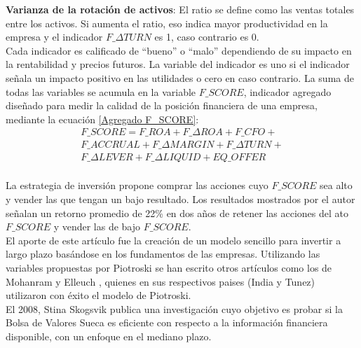 \textbf{Varianza de la rotación de activos}: El ratio se define como las ventas totales entre los activos. Si aumenta el ratio, eso indica mayor productividad en la empresa y el indicador $F\_\Delta TURN$ es 1, caso contrario es 0.\\

Cada indicador es calificado de “bueno” o “malo” dependiendo de su impacto en la rentabilidad y precios futuros. La variable del indicador es uno si el indicador señala un impacto positivo en las utilidades o cero en caso contrario. La suma de todas las variables se acumula en la variable $F\_SCORE$, indicador agregado diseñado para medir la calidad de la posición financiera de una empresa,  mediante la ecuaci\'on \ref{Agregado F_SCORE}:\\

\begin{multline}
\label{Agregado F_SCORE}
F\_SCORE = F\_ROA + F\_\Delta ROA + F\_CFO + \\
F\_ACCRUAL + F\_\Delta MARGIN + F\_\Delta TURN + \\
F\_\Delta LEVER + F\_\Delta LIQUID + EQ\_OFFER \\
\end{multline}

La estrategia de inversión propone comprar las acciones cuyo $F\_SCORE$ sea alto y vender las que tengan un bajo resultado. Los resultados mostrados por el autor señalan un retorno promedio de 22\% en dos años de retener las acciones del ato $F\_SCORE$ y vender las de bajo $F\_SCORE$.\\

El aporte de este art\'iculo fue la creación de un modelo sencillo para invertir a largo plazo basándose en los fundamentos de las empresas. Utilizando las variables propuestas por Piotroski se han escrito otros artículos como los de Mohanram \cite{Mohanram2005} y Elleuch \cite{Elleuch2009}, quienes en sus respectivos paises (India y Tunez) utilizaron con \'exito el modelo de Piotroski.\\



El 2008, Stina Skogsvik \cite{Skogsvik2008} publica una investigación cuyo objetivo es probar si la Bolsa de Valores Sueca es eficiente con respecto a la información financiera disponible, con un enfoque en el mediano plazo.\\

